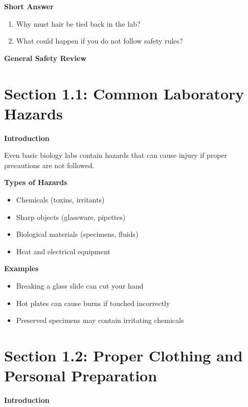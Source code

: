 \documentclass[
  letterpaper,
  DIV=11,
  numbers=noendperiod]{scrreprt}
\begin{document}
\textbf{Short Answer}

\begin{enumerate}
\def\labelenumi{\arabic{enumi}.}
\setcounter{enumi}{3}
\item
  Why must hair be tied back in the lab?
\item
  What could happen if you do not follow safety rules?
\end{enumerate}

\textbf{General Safety Review}\\

\section{\texorpdfstring{\textbf{Section 1.1: Common Laboratory
Hazards}}{Section 1.1: Common Laboratory Hazards}}\label{section-1.1-common-laboratory-hazards}

\textbf{Introduction}

Even basic biology labs contain hazards that can cause injury if proper
precautions are not followed.

\textbf{Types of Hazards}

\begin{itemize}
\item
  Chemicals (toxins, irritants)
\item
  Sharp objects (glassware, pipettes)
\item
  Biological materials (specimens, fluids)
\item
  Heat and electrical equipment
\end{itemize}

\textbf{Examples}

\begin{itemize}
\item
  Breaking a glass slide can cut your hand
\item
  Hot plates can cause burns if touched incorrectly
\item
  Preserved specimens may contain irritating chemicals
\end{itemize}

\section{\texorpdfstring{\textbf{Section 1.2: Proper Clothing and
Personal
Preparation}}{Section 1.2: Proper Clothing and Personal Preparation}}\label{section-1.2-proper-clothing-and-personal-preparation}

\textbf{Introduction}
\end{document}
